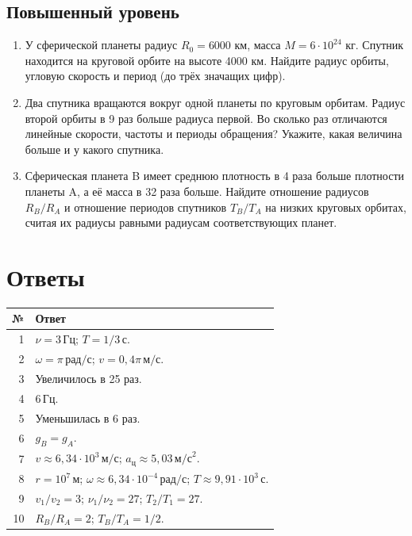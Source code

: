 \documentclass[a4paper,12pt]{article}
\newcommand{\unit}[1]{\,\text{#1}}
\begin{document}
\subsection*{Повышенный уровень}
\begin{enumerate}[resume,itemsep=16pt]
\item У сферической планеты радиус $R_0=6000$ км, масса $M=6\cdot10^{24}$ кг. Спутник находится на круговой орбите на высоте 4000 км. Найдите радиус орбиты, угловую скорость и период (до трёх значащих цифр).
\vspace{12mm}
\item Два спутника вращаются вокруг одной планеты по круговым орбитам. Радиус второй орбиты в 9 раз больше радиуса первой. Во сколько раз отличаются линейные скорости, частоты и периоды обращения? Укажите, какая величина больше и у какого спутника.
\vspace{12mm}
\item Сферическая планета B имеет среднюю плотность в 4 раза больше плотности планеты A, а её масса в 32 раза больше. Найдите отношение радиусов $R_B/R_A$ и отношение периодов спутников $T_B/T_A$ на низких круговых орбитах, считая их радиусы равными радиусам соответствующих планет.
\end{enumerate}
\clearpage
\section*{Ответы}
\begin{center}
\renewcommand{\arraystretch}{1.65}
\begin{tabularx}{\linewidth}{@{}r X@{}}
\toprule № & Ответ\\\midrule
1 & $\nu=3\unit{Гц}$; $T=1/3\unit{с}$.\\
2 & $\omega=\pi\unit{рад/с}$; $v=0{,}4\pi\unit{м/с}$.\\
3 & Увеличилось в 25 раз.\\
4 & $6\unit{Гц}$.\\
5 & Уменьшилась в 6 раз.\\
6 & $g_B=g_A$.\\
7 & $v\approx 6{,}34\cdot10^3\unit{м/с}$; $a_{\text{ц}}\approx 5{,}03\unit{м/с}^2$.\\
8 & $r=10^7\unit{м}$; $\omega\approx 6{,}34\cdot10^{-4}\unit{рад/с}$; $T\approx9{,}91\cdot10^3\unit{с}$.\\
9 & $v_1/v_2=3$; $\nu_1/\nu_2=27$; $T_2/T_1=27$.\\
10 & $R_B/R_A=2$; $T_B/T_A=1/2$.\\\bottomrule
\end{tabularx}
\end{center}
\vspace{7mm}
\end{document}
